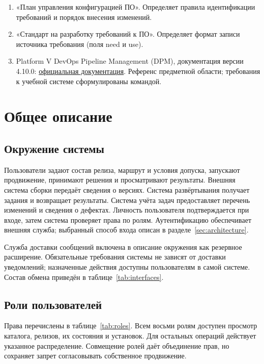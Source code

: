 \documentclass{tpks}
\begin{document}
\begin{enumerate}
\item «План управления конфигурацией ПО». Определяет правила идентификации требований и порядок внесения изменений.
\item «Стандарт на разработку требований к ПО». Определяет формат записи источника требования (поля need и use).
\item Platform V DevOps Pipeline Management (DPM), документация версии 4.10.0:
\href{https://platformv.sbertech.ru/docs/public/DPM/4.10.0/common/index.html}{официальная документация}.
Референс предметной области; требования к учебной системе сформулированы командой.
\end{enumerate}

\section{Общее описание}
\subsection{Окружение системы}

Пользователи задают состав релиза, маршрут и условия допуска, запускают продвижение,
принимают решения и просматривают результаты. Внешняя система сборки передаёт сведения
о версиях. Система развёртывания получает задания и возвращает результаты.
Система учёта задач предоставляет перечень изменений и сведения о дефектах.
Личность пользователя подтверждается при входе, затем система проверяет права по ролям.
Аутентификацию обеспечивает внешняя служба; выбранный способ входа описан
в разделе~\ref{sec:architecture}.

Служба доставки сообщений включена в описание окружения
как резервное расширение. Обязательные требования системы не зависят от доставки
уведомлений; назначенные действия доступны пользователям в самой системе.
Состав обмена приведён в таблице~\ref{tab:interfaces}.

\subsection{Роли пользователей}\label{sec:roles}

Права перечислены в таблице~\ref{tab:roles}. Всем восьми ролям доступен просмотр
каталога, релизов, их состояния и установок. Для остальных операций действует
указанное распределение. Совмещение ролей даёт объединение прав, но сохраняет
запрет согласовывать собственное продвижение.
\end{document}

